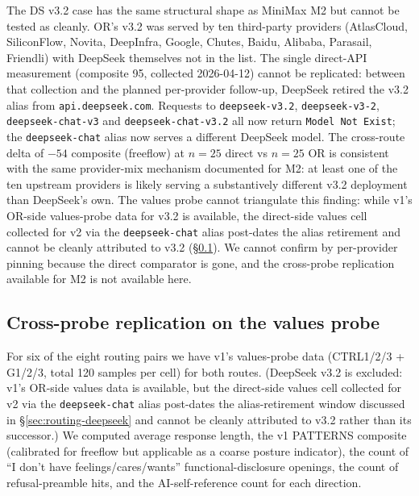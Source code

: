 \documentclass[11pt,a4paper]{article}
\begin{document}
The DS v3.2 case has the same structural shape as MiniMax M2 but cannot be tested as cleanly. OR's v3.2 was served by ten third-party providers (AtlasCloud, SiliconFlow, Novita, DeepInfra, Google, Chutes, Baidu, Alibaba, Parasail, Friendli) with DeepSeek themselves not in the list. The single direct-API measurement (composite 95, collected 2026-04-12) cannot be replicated: between that collection and the planned per-provider follow-up, DeepSeek retired the v3.2 alias from \texttt{api.deepseek.com}. Requests to \texttt{deepseek-v3.2}, \texttt{deepseek-v3-2}, \texttt{deepseek-chat-v3} and \texttt{deepseek-chat-v3.2} all now return \texttt{Model Not Exist}; the \texttt{deepseek-chat} alias now serves a different DeepSeek model. The cross-route delta of $-54$ composite (freeflow) at $n{=}25$ direct vs $n{=}25$ OR is consistent with the same provider-mix mechanism documented for M2: at least one of the ten upstream providers is likely serving a substantively different v3.2 deployment than DeepSeek's own. The values probe cannot triangulate this finding: while v1's OR-side values-probe data for v3.2 is available, the direct-side values cell collected for v2 via the \texttt{deepseek-chat} alias post-dates the alias retirement and cannot be cleanly attributed to v3.2 (\S\ref{sec:cross-probe}). We cannot confirm by per-provider pinning because the direct comparator is gone, and the cross-probe replication available for M2 is not available here.

\subsection{Cross-probe replication on the values probe}
\label{sec:cross-probe}

For six of the eight routing pairs we have v1's values-probe data (CTRL1/2/3 + G1/2/3, total 120 samples per cell) for both routes. (DeepSeek v3.2 is excluded: v1's OR-side values data is available, but the direct-side values cell collected for v2 via the \texttt{deepseek-chat} alias post-dates the alias-retirement window discussed in \S\ref{sec:routing-deepseek} and cannot be cleanly attributed to v3.2 rather than its successor.) We computed average response length, the v1 PATTERNS composite (calibrated for freeflow but applicable as a coarse posture indicator), the count of ``I don't have feelings/cares/wants'' functional-disclosure openings, the count of refusal-preamble hits, and the AI-self-reference count for each direction.
\end{document}
